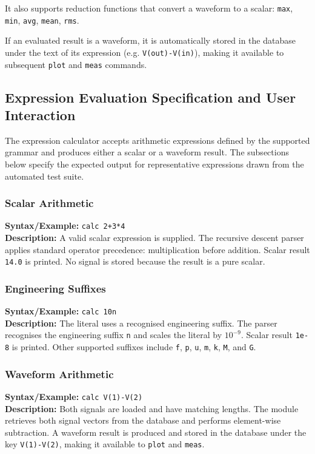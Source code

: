 It also supports reduction functions that convert a waveform to a scalar:
\texttt{max}, \texttt{min}, \texttt{avg}, \texttt{mean}, \texttt{rms}.

If an evaluated result is a waveform, it is automatically stored in the database under the text of its expression (e.g. \texttt{V(out)-V(in)}), making it available to subsequent \texttt{plot} and \texttt{meas} commands.

\subsection{Expression Evaluation Specification and User Interaction}
\label{sec:calc-spec}

The expression calculator accepts arithmetic expressions defined by the supported grammar and produces either a scalar or a waveform result. The subsections below specify the expected output for representative expressions drawn from the automated test suite.

\subsubsection{Scalar Arithmetic}
\textbf{Syntax/Example:} \texttt{calc 2+3*4}\\
\textbf{Description:} A valid scalar expression is supplied. The recursive descent parser applies standard operator precedence: multiplication before addition. Scalar result \texttt{14.0} is printed. No signal is stored because the result is a pure scalar.

\subsubsection{Engineering Suffixes}
\textbf{Syntax/Example:} \texttt{calc 10n}\\
\textbf{Description:} The literal uses a recognised engineering suffix. The parser recognises the engineering suffix \texttt{n} and scales the literal by $10^{-9}$. Scalar result \texttt{1e-8} is printed. Other supported suffixes include \texttt{f}, \texttt{p}, \texttt{u}, \texttt{m}, \texttt{k}, \texttt{M}, and \texttt{G}.

\subsubsection{Waveform Arithmetic}
\textbf{Syntax/Example:} \texttt{calc V(1)-V(2)}\\
\textbf{Description:} Both signals are loaded and have matching lengths. The module retrieves both signal vectors from the database and performs element-wise subtraction. A waveform result is produced and stored in the database under the key \texttt{V(1)-V(2)}, making it available to \texttt{plot} and \texttt{meas}.

